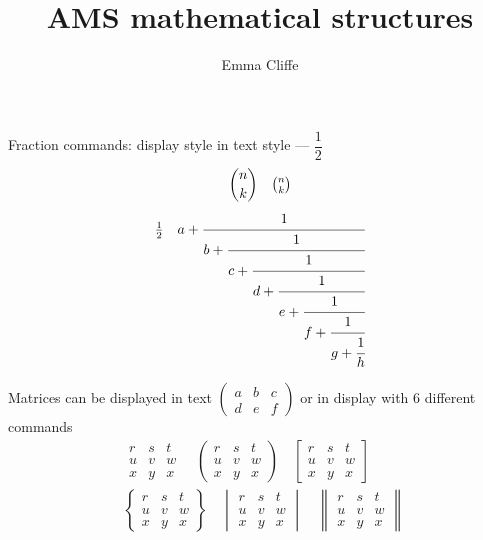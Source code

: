 \documentclass[12pt,a4paper,onecolumn]{article}
\title{AMS mathematical structures}
\author{Emma Cliffe}
\date{}
\begin{document}
\maketitle

\noindent
Fraction commands: display style in text style --- \(\dfrac{1}{2}\)
\begin{equation}
\binom{n}{k} \quad \tbinom{n}{k} 
\end{equation}
\begin{equation}
\tfrac{1}{2} \quad %
a + \cfrac{1}{b + \cfrac{1}{c + \cfrac{1}{d + \cfrac{1}{e + \cfrac{1}{f + \cfrac{1}{g + \cfrac{1}{h}}}}}}}
\end{equation}

\noindent
Matrices can be displayed in text \(\left(\begin{smallmatrix} a & b & c \\ d & e & f\end{smallmatrix}\right)\) or in display with 6 different commands
\begin{eqnarray*}
&&\begin{matrix} r & s & t \\ u & v & w \\ x & y & x\end{matrix}\quad
\begin{pmatrix} r & s & t \\ u & v & w \\ x & y & x\end{pmatrix}\quad
\begin{bmatrix} r & s & t \\ u & v & w \\ x & y & x\end{bmatrix}\\
&&\begin{Bmatrix} r & s & t \\ u & v & w \\ x & y & x\end{Bmatrix}\quad
\begin{vmatrix} r & s & t \\ u & v & w \\ x & y & x\end{vmatrix}\quad
\begin{Vmatrix} r & s & t \\ u & v & w \\ x & y & x\end{Vmatrix}\quad
\end{eqnarray*}
\end{document}
